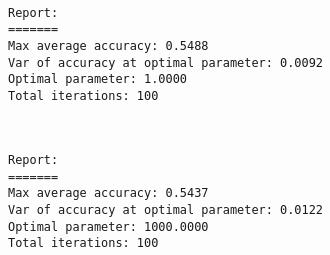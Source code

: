 \documentclass[11pt]{article}
\begin{document}
    \begin{center}
    \end{center}
    { \hspace*{\fill} \\}
    
    \begin{Verbatim}[commandchars=\\\{\}]
Report:
=======
Max average accuracy: 0.5488
Var of accuracy at optimal parameter: 0.0092
Optimal parameter: 1.0000
Total iterations: 100

    \end{Verbatim}

    \begin{center}
    \end{center}
    { \hspace*{\fill} \\}
    
    \begin{Verbatim}[commandchars=\\\{\}]
Report:
=======
Max average accuracy: 0.5437
Var of accuracy at optimal parameter: 0.0122
Optimal parameter: 1000.0000
Total iterations: 100

    \end{Verbatim}
\end{document}
